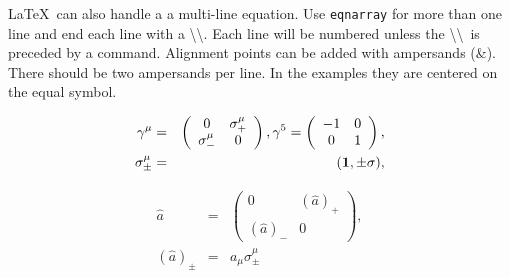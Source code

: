 \documentclass[preprint2]{aastex63}
\newcommand\latex{La\TeX}
\begin{document}
\latex\ can also handle a a multi-line equation.  Use {\tt\string eqnarray}
for more than one line and end each line with a
\textbackslash\textbackslash.  Each line will be numbered unless the
\textbackslash\textbackslash\ is preceded by a {\tt\string\nonumber}
command.  Alignment points can be added with ampersands (\&).  There should be
two ampersands per line. In the examples they are centered on the equal
symbol.

\begin{eqnarray}
\gamma^\mu  & = &
 \left(
\begin{array}{cc}
0 & \sigma^\mu_+ \\
\sigma^\mu_- & 0
\end{array}     \right) ,
 \gamma^5= \left(
\begin{array}{cc}
-1 &   0\\
0 &   1
\end{array}     \right)  , \\
\sigma^\mu_{\pm}  & = &   ({\bf 1} ,\pm \sigma) , 
\end{eqnarray}

\begin{eqnarray}
\hat a & = & \left(
\begin{array}{cc}
0 & (\hat a)_+\\
(\hat a)_- & 0
\end{array}\right), \nonumber \\
(\hat a)_\pm & = & a_\mu\sigma^\mu_\pm 
\end{eqnarray}

\end{document}
